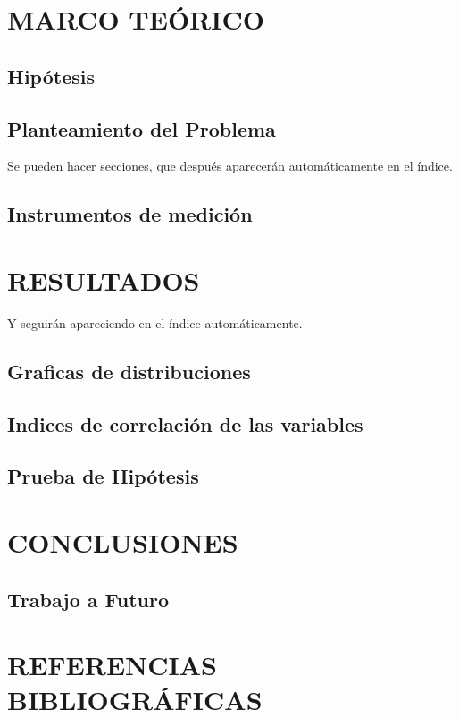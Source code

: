 \documentclass[a4paper,10pt]{report}
\begin{document}
{\section{MARCO TEÓRICO}

\subsection{Hipótesis}

\subsection{Planteamiento del Problema}

Se pueden hacer secciones, que después aparecerán automáticamente en el índice.

\subsection{Instrumentos de medición}

\section{RESULTADOS}

Y seguirán apareciendo en el índice automáticamente.

\subsection{Graficas de distribuciones}

\subsection{Indices de correlación de las variables}

\subsection{Prueba de Hipótesis}

\section{CONCLUSIONES}

\subsection{Trabajo a Futuro}

\section{REFERENCIAS BIBLIOGRÁFICAS}

}
\end{document}

